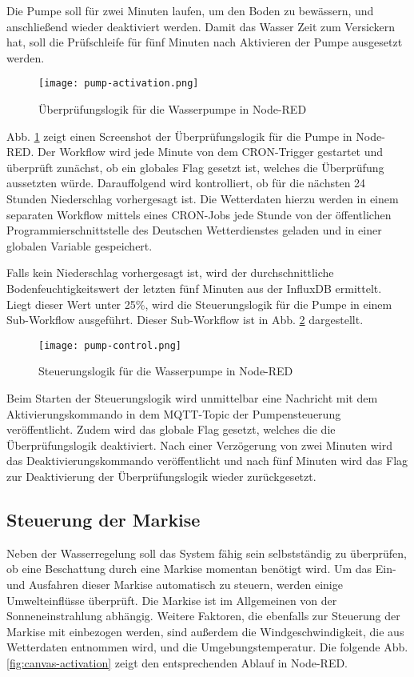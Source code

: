 Die Pumpe soll für zwei Minuten laufen, um den Boden zu bewässern, und anschließend wieder deaktiviert werden. Damit das Wasser Zeit zum Versickern hat, soll die Prüfschleife für fünf Minuten nach Aktivieren der Pumpe ausgesetzt werden.

\begin{figure}[h]
  \centering
  \texttt{[image: pump-activation.png]}
  \caption{Überprüfungslogik für die Wasserpumpe in Node-RED}\label{fig:pump-activation}
\end{figure}

Abb. \ref{fig:pump-activation} zeigt einen Screenshot der Überprüfungslogik für die Pumpe in Node-RED.
Der Workflow wird jede Minute von dem CRON-Trigger gestartet und überprüft zunächst, ob ein globales Flag gesetzt ist, welches die Überprüfung aussetzten würde.
Darauffolgend wird kontrolliert, ob für die nächsten 24 Stunden Niederschlag vorhergesagt ist.
Die Wetterdaten hierzu werden in einem separaten Workflow mittels eines CRON-Jobs jede Stunde von der öffentlichen Programmierschnittstelle des Deutschen Wetterdienstes geladen und in einer globalen Variable gespeichert.

Falls kein Niederschlag vorhergesagt ist, wird der durchschnittliche Bodenfeuchtigkeitswert der letzten fünf Minuten aus der InfluxDB ermittelt.
Liegt dieser Wert unter 25\%, wird die Steuerungslogik für die Pumpe in einem Sub-Workflow ausgeführt.
Dieser Sub-Workflow ist in Abb. \ref{fig:pump-control} dargestellt.

\begin{figure}[h]
  \centering
  \texttt{[image: pump-control.png]}
  \caption{Steuerungslogik für die Wasserpumpe in Node-RED}\label{fig:pump-control}
\end{figure}

Beim Starten der Steuerungslogik wird unmittelbar eine Nachricht mit dem Aktivierungskommando in dem MQTT-Topic der Pumpensteuerung veröffentlicht.
Zudem wird das globale Flag gesetzt, welches die die Überprüfungslogik deaktiviert.
Nach einer Verzögerung von zwei Minuten wird das Deaktivierungskommando veröffentlicht und nach fünf Minuten wird das Flag zur Deaktivierung der Überprüfungslogik wieder zurückgesetzt.

\subsection{Steuerung der Markise}

Neben der Wasserregelung soll das System fähig sein selbstständig zu überprüfen, ob eine Beschattung durch eine Markise momentan benötigt wird. Um  das Ein- und Ausfahren dieser Markise automatisch zu steuern, werden einige Umwelteinflüsse überprüft. Die Markise ist im Allgemeinen von der Sonneneinstrahlung abhängig. Weitere Faktoren, die ebenfalls zur Steuerung der Markise mit einbezogen werden, sind außerdem die Windgeschwindigkeit, die aus Wetterdaten entnommen wird, und die Umgebungstemperatur.
Die folgende Abb. \ref{fig:canvas-activation} zeigt den entsprechenden Ablauf in Node-RED.

